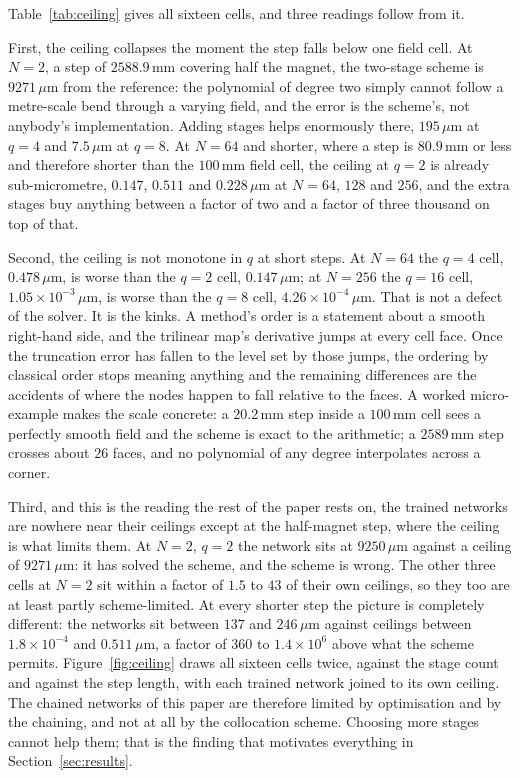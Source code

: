 \documentclass[11pt,a4paper]{article}
\newcommand{\um}{\ensuremath{\,\mu\mathrm{m}}}
\newcommand{\mm}{\ensuremath{\,\mathrm{mm}}}
\begin{document}
Table~\ref{tab:ceiling} gives all sixteen cells, and three readings follow from
it.

First, the ceiling collapses the moment the step falls below one field cell. At
$N = 2$, a step of $2588.9\mm$ covering half the magnet, the two-stage scheme is
$9271\um$ from the reference: the polynomial of degree two simply cannot follow a
metre-scale bend through a varying field, and the error is the scheme's, not
anybody's implementation. Adding stages helps enormously there, $195\um$ at
$q = 4$ and $7.5\um$ at $q = 8$. At $N = 64$ and shorter, where a step is
$80.9\mm$ or less and therefore shorter than the $100\mm$ field cell, the
ceiling at $q = 2$ is already sub-micrometre, $0.147$, $0.511$ and $0.228\um$
at $N = 64$, $128$ and $256$, and the extra stages buy anything between a
factor of two and a factor of three thousand on top of that.

Second, the ceiling is not monotone in $q$ at short steps. At $N = 64$ the
$q = 4$ cell, $0.478\um$, is worse than the $q = 2$ cell, $0.147\um$; at
$N = 256$ the $q = 16$ cell, $1.05 \times 10^{-3}\um$, is worse than the $q = 8$
cell, $4.26 \times 10^{-4}\um$. That is not a defect of the solver. It is the
kinks. A method's order is a statement about a smooth right-hand side, and the
trilinear map's derivative jumps at every cell face. Once the truncation error
has fallen to the level set by those jumps, the ordering by classical order stops
meaning anything and the remaining differences are the accidents of where the
nodes happen to fall relative to the faces. A worked micro-example makes the
scale concrete: a $20.2\mm$ step inside a $100\mm$ cell sees a perfectly smooth
field and the scheme is exact to the arithmetic; a $2589\mm$ step crosses about
$26$ faces, and no polynomial of any degree interpolates across a corner.

Third, and this is the reading the rest of the paper rests on, the trained
networks are nowhere near their ceilings except at the half-magnet step, where
the ceiling is what limits them. At $N = 2$, $q = 2$ the network sits at
$9250\um$ against a ceiling of $9271\um$: it has solved the scheme, and the
scheme is wrong. The other three cells at $N = 2$ sit within a factor of $1.5$
to $43$ of their own ceilings, so they too are at least partly scheme-limited.
At every shorter step the picture is completely different: the networks sit
between $137$ and $246\um$ against ceilings between $1.8 \times 10^{-4}$ and
$0.511\um$, a factor of $360$ to $1.4 \times 10^{6}$ above what the scheme
permits. Figure~\ref{fig:ceiling} draws all sixteen cells twice, against the
stage count and against the step length, with each trained network joined to its
own ceiling. The chained networks of this paper are therefore limited by
optimisation and by the chaining, and not at all by the collocation scheme. Choosing more stages cannot help them; that is the finding that motivates
everything in Section~\ref{sec:results}.
\end{document}
